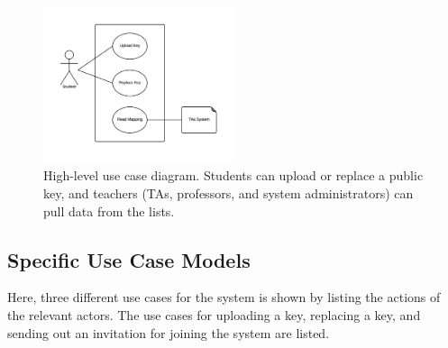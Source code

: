\documentclass[11pt,a4paper]{report}
\begin{document}
\begin{figure}[H]
\centering
\includegraphics[width=0.5\textwidth]{pictures/use_case_pksu_del2_b_high}
\caption{High-level use case diagram. Students can upload or replace a public key, and teachers (TAs, professors, and system administrators) can pull data from the lists.}
\label{fig:use_case_diagram_high_level}
\end{figure}


\subsection{Specific Use Case Models}\label{subsec:Specific_Use_case_model}
Here, three different use cases for the system is shown by listing the actions of the relevant actors. The use cases for uploading a key, replacing a key, and sending out an invitation for joining the system are listed.
\end{document}
